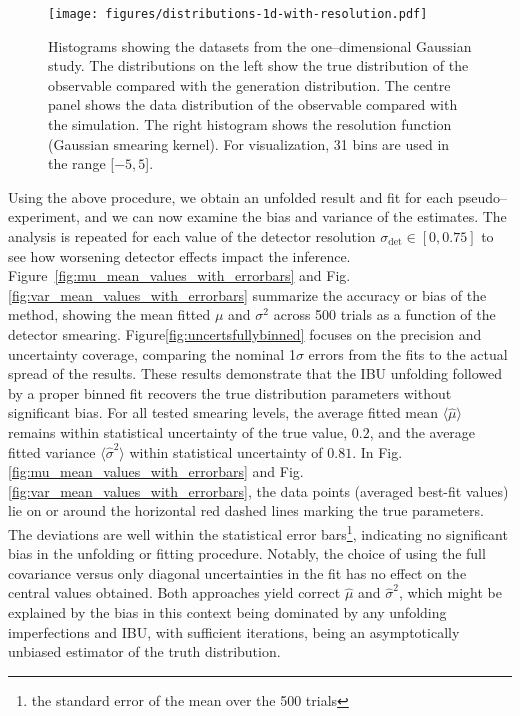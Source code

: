             \begin{figure}
                \centering
                \texttt{[image: figures/distributions-1d-with-resolution.pdf]}
                \caption{Histograms showing the datasets from the one--dimensional Gaussian study.
                The distributions on the left show the true distribution of the observable compared with the generation distribution.
                The centre panel shows the data distribution of the observable compared with the simulation.
                The right histogram shows the resolution function (Gaussian smearing kernel).
                For visualization, 31 bins are used in the range [$-5,5$].}
                \label{fig:distributions-1d}
            \end{figure}
            Using the above procedure, we obtain an unfolded result and fit for each pseudo--experiment, and we can now examine the bias and variance of the estimates.
            The analysis is repeated for each value of the detector resolution $\sigma_{\text{det}}\in[0, 0.75]$ to see how worsening detector effects impact the inference.
            Figure~\ref{fig:mu_mean_values_with_errorbars} and Fig.\ref{fig:var_mean_values_with_errorbars} summarize the accuracy or bias of the method, showing the mean fitted $\mu$ and $\sigma^2$ across 500 trials as a function of the detector smearing.
            Figure\ref{fig:uncertsfullybinned} focuses on the precision and uncertainty coverage, comparing the nominal 1$\sigma$ errors from the fits to the actual spread of the results.
            These results demonstrate that the IBU unfolding followed by a proper binned fit recovers the true distribution parameters without significant bias.
            For all tested smearing levels, the average fitted mean $\langle \hat{\mu}\rangle$ remains within statistical uncertainty of the true value, \(0.2\), and the average fitted variance $\langle \hat{\sigma}^2\rangle$ within statistical uncertainty of \(0.81\).
            In Fig.\ref{fig:mu_mean_values_with_errorbars} and Fig.\ref{fig:var_mean_values_with_errorbars}, the data points (averaged best-fit values) lie on or around the horizontal red dashed lines marking the true parameters.
            The deviations are well within the statistical error bars\footnote{the standard error of the mean over the 500 trials}, indicating no significant bias in the unfolding or fitting procedure.
            Notably, the choice of using the full covariance versus only diagonal uncertainties in the fit has no effect on the central values obtained.
            Both approaches yield correct $\hat{\mu}$ and $\hat{\sigma}^2$, which might be explained by the bias in this context being dominated by any unfolding imperfections and IBU, with sufficient iterations, being an asymptotically unbiased estimator of the truth distribution.
    
